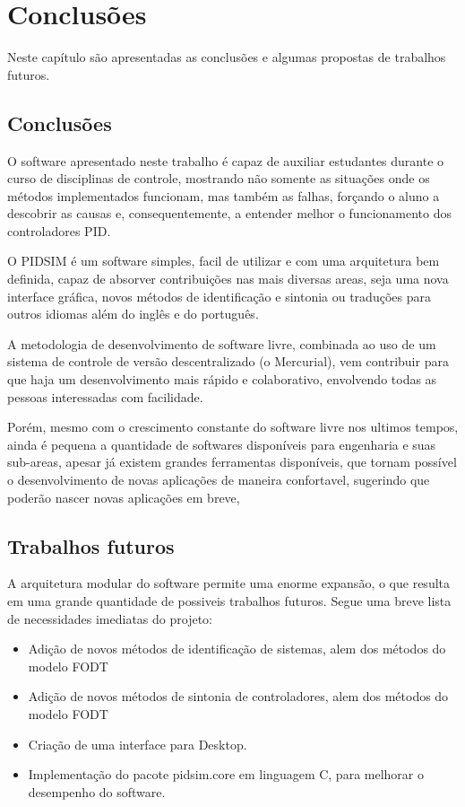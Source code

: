 \chapter{Conclusões \label{cap:conclusoes}}

Neste capítulo são apresentadas as conclusões e algumas propostas de
trabalhos futuros.

\section{Conclusões}

    O software apresentado neste trabalho é capaz de auxiliar estudantes
    durante o curso de disciplinas de controle, mostrando não somente
    as situações onde os métodos implementados funcionam, mas também as
    falhas, forçando o aluno a descobrir as causas e, consequentemente, a
    entender melhor o funcionamento dos controladores \acs{PID}.

    O PIDSIM é um software simples, facil de utilizar e com uma arquitetura
    bem definida, capaz de absorver contribuições nas mais diversas areas,
    seja uma nova interface gráfica, novos métodos de identificação
    e sintonia ou traduções para outros idiomas além do inglês e do português.
    
    A metodologia de desenvolvimento de software livre, combinada ao uso
    de um sistema de controle de versão descentralizado (o Mercurial), vem
    contribuir para que haja um desenvolvimento mais rápido e colaborativo,
    envolvendo todas as pessoas interessadas com facilidade.
    
    Porém, mesmo com o crescimento constante do software livre nos ultimos tempos,
    ainda é pequena a quantidade de softwares disponíveis para engenharia
    e suas sub-areas, apesar já existem grandes ferramentas disponíveis,
    que tornam possível o desenvolvimento de novas aplicações de maneira
    confortavel, sugerindo que poderão nascer novas aplicações em breve,
    

\section{Trabalhos futuros}

    A arquitetura modular do software permite uma enorme expansão, o que
    resulta em uma grande quantidade de possiveis trabalhos futuros.
    Segue uma breve lista de necessidades imediatas do projeto:
    
    \begin{itemize}
        \item Adição de novos métodos de identificação de sistemas, alem dos
            métodos do modelo \acs{FODT}
        \item Adição de novos métodos de sintonia de controladores, alem dos
            métodos do modelo \acs{FODT}
        \item Criação de uma interface para Desktop.
        \item Implementação do pacote pidsim.core em linguagem C, para melhorar
            o desempenho do software.
    \end{itemize}
